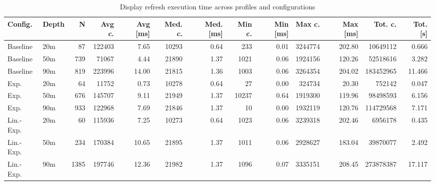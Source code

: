 \begin{landscape}
\begin{table}[p]
\centering
\small
\renewcommand{\arraystretch}{1.15}
\begin{tabular}{llrrrrrrrrrrr}
\toprule
Config. & Depth & N & Avg c. & Avg [\si{\milli\second}] & Med. c. & Med. [\si{\milli\second}] & Min c. & Min [\si{\milli\second}] & Max c. & Max [\si{\milli\second}] & Tot. c. & Tot. [\si{\second}] \\
\midrule
Baseline & 20m & 87 & 122403 & 7.65 & 10293 & 0.64 & 233 & 0.01 & 3244774 & 202.80 & 10649112 & 0.666 \\
Baseline & 50m & 739 & 71067 & 4.44 & 21890 & 1.37 & 1021 & 0.06 & 1924156 & 120.26 & 52518616 & 3.282 \\
Baseline & 90m & 819 & 223996 & 14.00 & 21815 & 1.36 & 1003 & 0.06 & 3264354 & 204.02 & 183452965 & 11.466 \\
Exp. & 20m & 64 & 11752 & 0.73 & 10278 & 0.64 & 27 & 0.00 & 324734 & 20.30 & 752142 & 0.047 \\
Exp. & 50m & 676 & 145707 & 9.11 & 21949 & 1.37 & 10237 & 0.64 & 1919300 & 119.96 & 98498593 & 6.156 \\
Exp. & 90m & 933 & 122968 & 7.69 & 21846 & 1.37 & 10 & 0.00 & 1932119 & 120.76 & 114729568 & 7.171 \\
Lin.-Exp. & 20m & 60 & 115936 & 7.25 & 10273 & 0.64 & 1023 & 0.06 & 3239318 & 202.46 & 6956178 & 0.435 \\
Lin.-Exp. & 50m & 234 & 170384 & 10.65 & 21895 & 1.37 & 1011 & 0.06 & 2928627 & 183.04 & 39870077 & 2.492 \\
Lin.-Exp. & 90m & 1385 & 197746 & 12.36 & 21982 & 1.37 & 1096 & 0.07 & 3335151 & 208.45 & 273878387 & 17.117 \\
\bottomrule
\end{tabular}
\caption{Display refresh execution time across profiles and configurations}
\label{tab:timing_display_refresh}
\end{table}
\end{landscape}
